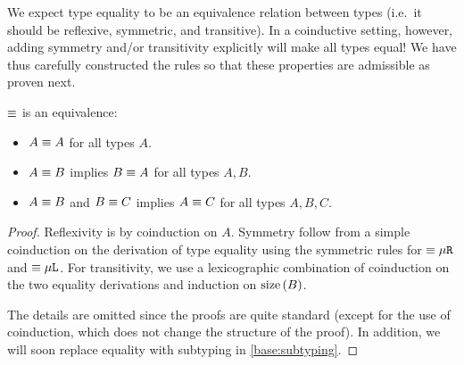 
We expect type equality to be an equivalence relation between types (i.e.\ it should be reflexive, symmetric, and transitive). In a coinductive setting, however, adding symmetry and/or transitivity explicitly will make all types equal! We have thus carefully constructed the rules so that these properties are admissible as proven next.


\begin{theorem}
  \label{eq-is-equivalence}
  $\equiv$ is an equivalence:
  \begin{itemize}
    \item $A \equiv A$ for all types $A$.
    \item $A \equiv B$ implies $B \equiv A$ for all types $A, B$.
    \item $A \equiv B$ and $B \equiv C$ implies $A \equiv C$ for all types $A, B, C$.
  \end{itemize}
\end{theorem}

\begin{proof}
  Reflexivity is by coinduction on $A$. Symmetry follow from a simple coinduction on the derivation of type equality using the symmetric rules for $\equiv{\mu\texttt{R}}$ and $\equiv{\mu\texttt{L}}$. For transitivity, we use a lexicographic combination of coinduction on the two equality derivations and induction on $\operatorname{size}{(B)}$.

The details are omitted since the proofs are quite standard (except for the use of coinduction, which does not change the structure of the proof). In addition, we will soon replace equality with subtyping in \cref{base:subtyping}.
\end{proof}


